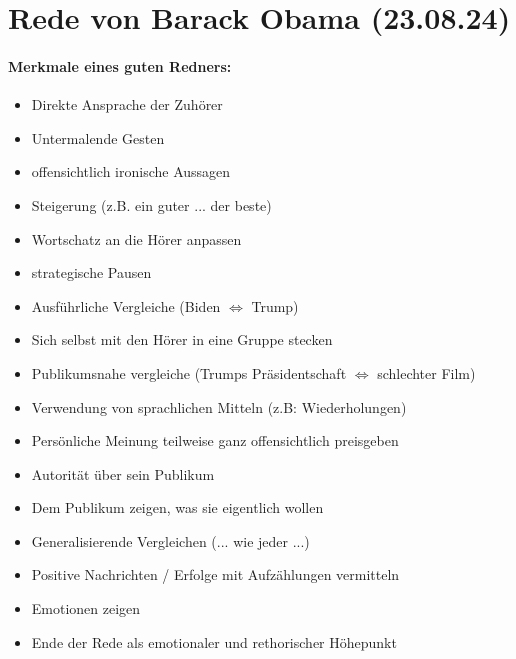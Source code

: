 \documentclass[../Deutsch.tex]{subfiles}
\begin{document}
	\section{Rede von Barack Obama (23.08.24)}
	\paragraph{Merkmale eines guten Redners:} \mbox \\
	\begin{itemize}
		\item Direkte Ansprache der Zuhörer
		\item Untermalende Gesten
		\item offensichtlich ironische Aussagen
		\item Steigerung (z.B. ein guter ... der beste)
		\item Wortschatz an die Hörer anpassen
		\item strategische Pausen
		\item Ausführliche Vergleiche (Biden $\Leftrightarrow$ Trump)
		\item Sich selbst mit den Hörer in eine Gruppe stecken
		\item Publikumsnahe vergleiche (Trumps Präsidentschaft $\Leftrightarrow$ schlechter Film)
		\item Verwendung von sprachlichen Mitteln (z.B: Wiederholungen)
		\item Persönliche Meinung teilweise ganz offensichtlich preisgeben
		\item Autorität über sein Publikum
		\item Dem Publikum zeigen, was sie eigentlich wollen
		\item Generalisierende Vergleichen (... wie jeder ...)
		\item Positive Nachrichten / Erfolge mit Aufzählungen vermitteln 
		\item Emotionen zeigen
		\item Ende der Rede als emotionaler und rethorischer Höhepunkt
	\end{itemize}
\end{document}
